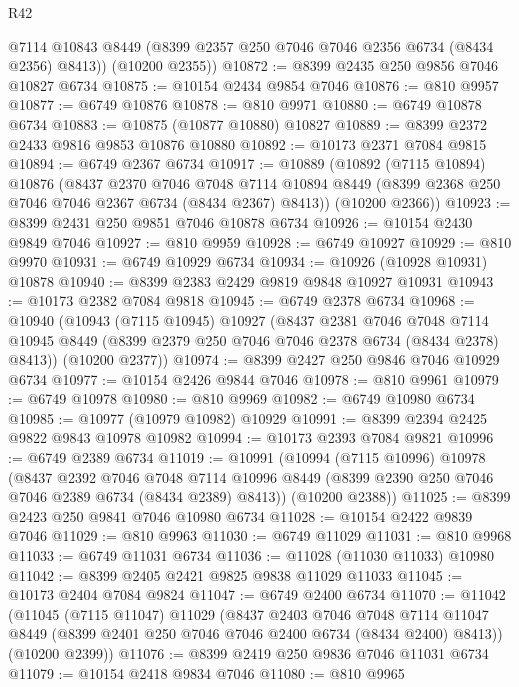 \begin{lexlean}{R42}
\begin{coremodule}
{        @7114
        @10843
        @8449
        (@8399 @2357 @250 @7046 @7046 @2356 @6734 (@8434 @2356) @8413))
      (@10200 @2355))
@10872 := @8399 @2435 @250 @9856 @7046 @10827 @6734
@10875 := @10154 @2434 @9854 @7046
@10876 := @810 @9957
@10877 := @6749 @10876
@10878 := @810 @9971
@10880 := @6749 @10878 @6734
@10883 := @10875 (@10877 @10880) @10827
@10889 := @8399 @2372 @2433 @9816 @9853 @10876 @10880
@10892 := @10173 @2371 @7084 @9815
@10894 := @6749 @2367 @6734
@10917 := @10889
    (@10892
      (@7115 @10894)
      @10876
      (@8437
        @2370
        @7046
        @7048
        @7114
        @10894
        @8449
        (@8399 @2368 @250 @7046 @7046 @2367 @6734 (@8434 @2367) @8413))
      (@10200 @2366))
@10923 := @8399 @2431 @250 @9851 @7046 @10878 @6734
@10926 := @10154 @2430 @9849 @7046
@10927 := @810 @9959
@10928 := @6749 @10927
@10929 := @810 @9970
@10931 := @6749 @10929 @6734
@10934 := @10926 (@10928 @10931) @10878
@10940 := @8399 @2383 @2429 @9819 @9848 @10927 @10931
@10943 := @10173 @2382 @7084 @9818
@10945 := @6749 @2378 @6734
@10968 := @10940
    (@10943
      (@7115 @10945)
      @10927
      (@8437
        @2381
        @7046
        @7048
        @7114
        @10945
        @8449
        (@8399 @2379 @250 @7046 @7046 @2378 @6734 (@8434 @2378) @8413))
      (@10200 @2377))
@10974 := @8399 @2427 @250 @9846 @7046 @10929 @6734
@10977 := @10154 @2426 @9844 @7046
@10978 := @810 @9961
@10979 := @6749 @10978
@10980 := @810 @9969
@10982 := @6749 @10980 @6734
@10985 := @10977 (@10979 @10982) @10929
@10991 := @8399 @2394 @2425 @9822 @9843 @10978 @10982
@10994 := @10173 @2393 @7084 @9821
@10996 := @6749 @2389 @6734
@11019 := @10991
    (@10994
      (@7115 @10996)
      @10978
      (@8437
        @2392
        @7046
        @7048
        @7114
        @10996
        @8449
        (@8399 @2390 @250 @7046 @7046 @2389 @6734 (@8434 @2389) @8413))
      (@10200 @2388))
@11025 := @8399 @2423 @250 @9841 @7046 @10980 @6734
@11028 := @10154 @2422 @9839 @7046
@11029 := @810 @9963
@11030 := @6749 @11029
@11031 := @810 @9968
@11033 := @6749 @11031 @6734
@11036 := @11028 (@11030 @11033) @10980
@11042 := @8399 @2405 @2421 @9825 @9838 @11029 @11033
@11045 := @10173 @2404 @7084 @9824
@11047 := @6749 @2400 @6734
@11070 := @11042
    (@11045
      (@7115 @11047)
      @11029
      (@8437
        @2403
        @7046
        @7048
        @7114
        @11047
        @8449
        (@8399 @2401 @250 @7046 @7046 @2400 @6734 (@8434 @2400) @8413))
      (@10200 @2399))
@11076 := @8399 @2419 @250 @9836 @7046 @11031 @6734
@11079 := @10154 @2418 @9834 @7046
@11080 := @810 @9965
}
\end{coremodule}
\end{lexlean}
